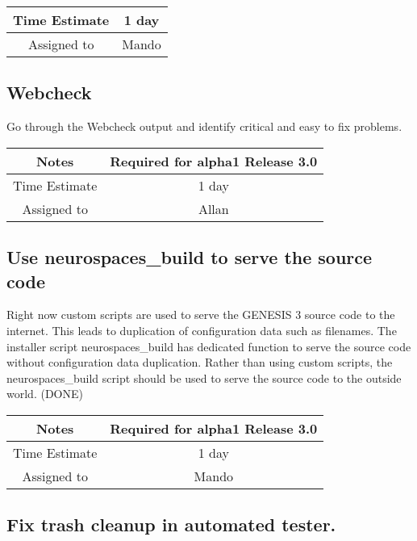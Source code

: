 \documentclass[12pt]{article}
\begin{document}
{
  \vspace{5mm}
  \centering
  \begin{tabular}{|c|c|}
    \hline
    Time Estimate
    & 1 day \\
    \hline
    Assigned to
    & Mando \\
    \hline
  \end{tabular}
}


\subsection{Webcheck}

Go through the Webcheck output and identify critical and easy to fix
problems.

{
  \vspace{5mm}
  \centering
  \begin{tabular}{|c|c|}
    \hline
    Notes
    & Required for alpha1 Release 3.0 \\
    \hline
    Time Estimate
    & 1 day \\
    \hline
    Assigned to
    & Allan \\
    \hline
  \end{tabular}
}


\subsection{Use neurospaces\_build to serve the source code}

Right now custom scripts are used to serve the GENESIS 3 source code
to the internet.  This leads to duplication of configuration data such
as filenames.  The installer script neurospaces\_build has dedicated
function to serve the source code without configuration data
duplication.  Rather than using custom scripts, the neurospaces\_build
script should be used to serve the source code to the outside world. (DONE)

{
  \vspace{5mm}
  \centering
  \begin{tabular}{|c|c|}
    \hline
    Notes
    & Required for alpha1 Release 3.0 \\
    \hline
    Time Estimate
    & 1 day \\
    \hline
    Assigned to
    & Mando \\
    \hline
  \end{tabular}
}





\subsection{Fix trash cleanup in automated tester.}
\end{document}
